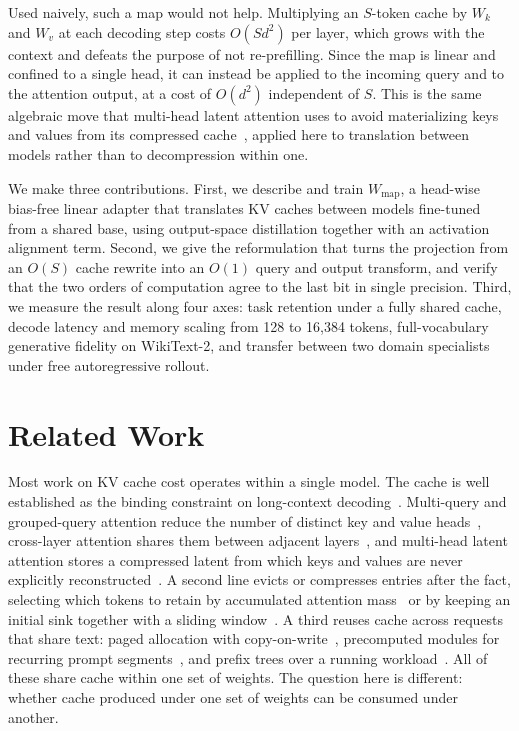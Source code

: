 \documentclass[11pt]{article}
\begin{document}
Used naively, such a map would not help. Multiplying an $S$-token cache by $W_k$ and $W_v$
at each decoding step costs $O(S d^2)$ per layer, which grows with the context and defeats
the purpose of not re-prefilling. Since the map is linear and confined to a single head, it
can instead be applied to the incoming query and to the attention output, at a cost of
$O(d^2)$ independent of $S$. This is the same algebraic move that multi-head latent
attention uses to avoid materializing keys and values from its compressed
cache~\cite{deepseekv2}, applied here to translation between models rather than to
decompression within one.

We make three contributions. First, we describe and train $W_{\mathrm{map}}$, a head-wise
bias-free linear adapter that translates KV caches between models fine-tuned from a shared
base, using output-space distillation together with an activation alignment term. Second,
we give the reformulation that turns the projection from an $O(S)$ cache rewrite into an
$O(1)$ query and output transform, and verify that the two orders of computation agree to
the last bit in single precision. Third, we measure the result along four axes: task
retention under a fully shared cache, decode latency and memory scaling from 128 to
16{,}384 tokens, full-vocabulary generative fidelity on WikiText-2, and transfer between
two domain specialists under free autoregressive rollout.

\section{Related Work}

Most work on KV cache cost operates within a single model. The cache is well established as
the binding constraint on long-context decoding~\cite{pope2023efficiently}. Multi-query and
grouped-query attention reduce the number of distinct key and value
heads~\cite{shazeer2019mqa, ainslie2023gqa}, cross-layer attention shares them between adjacent
layers~\cite{brandon2024cla}, and multi-head latent attention stores a compressed latent
from which keys and values are never explicitly reconstructed~\cite{deepseekv2}. A second
line evicts or compresses entries after the fact, selecting which tokens to retain by
accumulated attention mass~\cite{zhang2023h2o} or by keeping an initial sink together with
a sliding window~\cite{xiao2024streaming}. A third reuses cache across requests that share
text: paged allocation with copy-on-write~\cite{kwon2023vllm}, precomputed modules for
recurring prompt segments~\cite{gim2024promptcache}, and prefix trees over a running
workload~\cite{zheng2024sglang}. All of these share cache within one set of weights. The
question here is different: whether cache produced under one set of weights can be consumed
under another.
\end{document}
